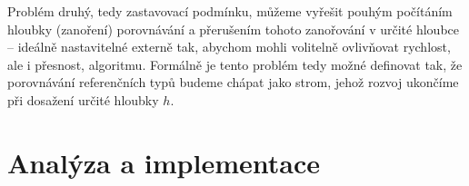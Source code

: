 Problém druhý, tedy zastavovací podmínku, můžeme vyřešit pouhým počítáním hloubky (zanoření) porovnávání a přerušením tohoto zanořování v určité hloubce -- ideálně nastavitelné externě tak, abychom mohli volitelně ovlivňovat rychlost, ale i přesnost, algoritmu. Formálně je tento problém tedy možné definovat tak, že porovnávání referenčních typů budeme chápat jako strom, jehož rozvoj ukončíme při dosažení určité hloubky $h$.


\chapter{Analýza a implementace}
